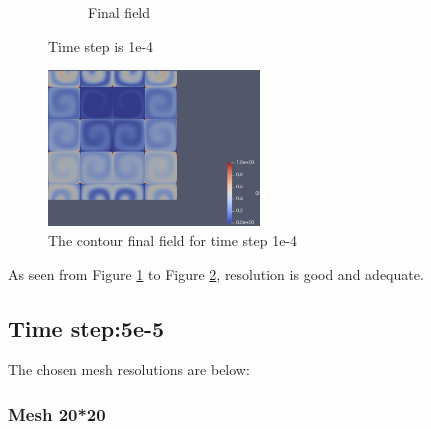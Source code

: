 \documentclass{article}
\begin{document}
\begin{figure}[hbt!]
\begin{subfigure}{0.4\textwidth}
        \caption{Final field}
  \end{subfigure}
  \caption{Time step is 1e-4}
  \label{t1m6_1} 
\end{figure}

\begin{figure}[hbt!]
    \centering
    \includegraphics[width=0.5\textwidth]{Figures/e-4 400x400/contour.png}
    \caption{The contour final field for time step 1e-4}
    \label{t1m6_2} 
\end{figure}

As seen from Figure \ref{t1m6_1} to Figure \ref{t1m6_2}, resolution is good and adequate.


\clearpage
\subsection{Time step:5e-5}

The chosen mesh resolutions are below: 

\subsubsection{Mesh 20*20}
\end{document}
